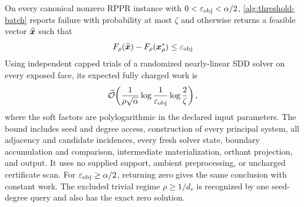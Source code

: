 \begin{theorem}
\label{thm:op2}
On every canonical nonzero RPPR instance with
$0<\varepsilon_{\mathrm{obj}}<\alpha/2$, \cref{alg:threshold-batch} reports failure with
probability at most $\zeta$ and otherwise returns a feasible vector
$\widehat{\bm{x}}$ such that
\begin{equation}
 F_\rho(\widehat{\bm{x}})-F_\rho(\bm{x}_\rho^*)\leq\varepsilon_{\mathrm{obj}}
 \label{eq:proved-op2-gap}
\end{equation}
Using independent capped trials of a randomized nearly-linear SDD solver on
every exposed face, its expected fully charged work is
\begin{equation}
 \widetilde{\mathcal{O}}\!\left(
   \frac{1}{\rho\sqrt\alpha}
   \log\frac1{\varepsilon_{\mathrm{obj}}}\log\frac2\zeta
 \right),
 \label{eq:proved-op2-work}
\end{equation}
where the soft factors are polylogarithmic in the declared input parameters.
The bound includes seed and degree access, construction of every principal
system, all adjacency and candidate incidences, every fresh solver state,
boundary accumulation and comparison, intermediate materialization, orthant
projection, and output.  It uses no supplied support, ambient preprocessing,
or uncharged certificate scan.
For $\varepsilon_{\mathrm{obj}}\geq\alpha/2$, returning zero gives the same conclusion with
constant work.
The excluded trivial regime $\rho\geq1/d_v$ is recognized by one seed-degree
query and also has the exact zero solution.
\end{theorem}

